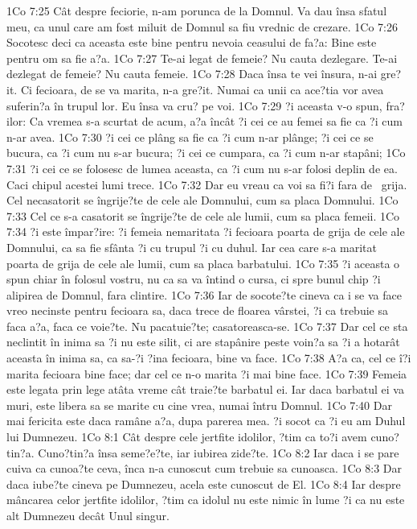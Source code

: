1Co 7:25  Cât despre feciorie, n-am porunca de la Domnul. Va dau însa sfatul meu, ca unul care am fost miluit de Domnul sa fiu vrednic de crezare.
1Co 7:26  Socotesc deci ca aceasta este bine pentru nevoia ceasului de fa?a: Bine este pentru om sa fie a?a.
1Co 7:27  Te-ai legat de femeie? Nu cauta dezlegare. Te-ai dezlegat de femeie? Nu cauta femeie.
1Co 7:28  Daca însa te vei însura, n-ai gre?it. Ci fecioara, de se va marita, n-a gre?it. Numai ca unii ca ace?tia vor avea suferin?a în trupul lor. Eu însa va cru? pe voi.
1Co 7:29  ?i aceasta v-o spun, fra?ilor: Ca vremea s-a scurtat de acum, a?a încât ?i cei ce au femei sa fie ca ?i cum n-ar avea.
1Co 7:30  ?i cei ce plâng sa fie ca ?i cum n-ar plânge; ?i cei ce se bucura, ca ?i cum nu s-ar bucura; ?i cei ce cumpara, ca ?i cum n-ar stapâni;
1Co 7:31  ?i cei ce se folosesc de lumea aceasta, ca ?i cum nu s-ar folosi deplin de ea. Caci chipul acestei lumi trece.
1Co 7:32  Dar eu vreau ca voi sa fi?i fara de  grija. Cel necasatorit se îngrije?te de cele ale Domnului, cum sa placa Domnului.
1Co 7:33  Cel ce s-a casatorit se îngrije?te de cele ale lumii, cum sa placa femeii.
1Co 7:34  ?i este împar?ire: ?i femeia nemaritata ?i fecioara poarta de grija de cele ale Domnului, ca sa fie sfânta ?i cu trupul ?i cu duhul. Iar cea care s-a maritat poarta de grija de cele ale lumii, cum sa placa barbatului.
1Co 7:35  ?i aceasta o spun chiar în folosul vostru, nu ca sa va întind o cursa, ci spre bunul chip ?i alipirea de Domnul, fara clintire.
1Co 7:36  Iar de socote?te cineva ca i se va face vreo necinste pentru fecioara sa, daca trece de floarea vârstei, ?i ca trebuie sa faca a?a, faca ce voie?te. Nu pacatuie?te; casatoreasca-se.
1Co 7:37  Dar cel ce sta neclintit în inima sa ?i nu este silit, ci are stapânire peste voin?a sa ?i a hotarât aceasta în inima sa, ca sa-?i ?ina fecioara, bine va face.
1Co 7:38  A?a ca, cel ce î?i marita fecioara bine face; dar cel ce n-o marita ?i mai bine face.
1Co 7:39  Femeia este legata prin lege atâta vreme cât traie?te barbatul ei. Iar daca barbatul ei va muri, este libera sa se marite cu cine vrea, numai întru Domnul.
1Co 7:40  Dar mai fericita este daca ramâne a?a, dupa parerea mea. ?i socot ca ?i eu am Duhul lui Dumnezeu.
1Co 8:1  Cât despre cele jertfite idolilor, ?tim ca to?i avem cuno?tin?a. Cuno?tin?a însa seme?e?te, iar iubirea zide?te.
1Co 8:2  Iar daca i se pare cuiva ca cunoa?te ceva, înca n-a cunoscut cum trebuie sa cunoasca.
1Co 8:3  Dar daca iube?te cineva pe Dumnezeu, acela este cunoscut de El.
1Co 8:4  Iar despre mâncarea celor jertfite idolilor, ?tim ca idolul nu este nimic în lume ?i ca nu este alt Dumnezeu decât Unul singur.
